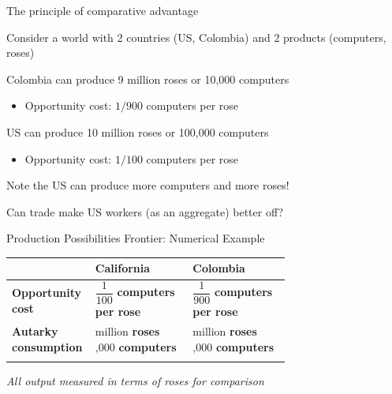 \documentclass[notes,11pt, aspectratio=169, xcolor=table]{beamer}
\newenvironment{wideitemize}{\itemize\addtolength{\itemsep}{10pt}}{\enditemize}
\begin{document}
\begin{frame}{The principle of comparative advantage}
    \begin{wideitemize} 
        \item Consider a world with 2 countries (US, Colombia) and 2 products (computers, roses)
        \item Colombia can produce 9 million roses or 10,000 computers
        \begin{itemize}
            \item Opportunity cost: $1/900$ computers per rose
        \end{itemize}
        \item US can produce 10 million roses or 100,000 computers
        \begin{itemize}
            \item Opportunity cost: $1/100$ computers per rose
        \end{itemize}
        \item Note the US can produce more computers and more roses!
        \item Can trade make US workers (as an aggregate) better off?
    \end{wideitemize}
\end{frame}



\begin{frame}{Production Possibilities Frontier: Numerical Example}
\begin{center}
\begin{tabular}{@{} l >{\centering\arraybackslash}m{0.35\linewidth} >{\centering\arraybackslash}m{0.35\linewidth} @{}}
\toprule
& \textbf{California} & \textbf{Colombia} \\
\midrule
\textbf{Opportunity cost} 
& $\dfrac{1}{100}$ \textbf{computers} \newline \textbf{per rose}
& $\dfrac{1}{900}$ \textbf{computers} \newline \textbf{per rose} \\
\addlinespace[1ex]
\textbf{Autarky consumption} 
& 10 million \textbf{roses} \newline 100,000 \textbf{computers} 
& 9 million \textbf{roses} \newline 10,000 \textbf{computers}   \\
\addlinespace[1ex]
\bottomrule
\end{tabular}

\vspace{1em}
\textit{All output measured in terms of roses for comparison}


\end{center}
\end{frame}
\end{document}
